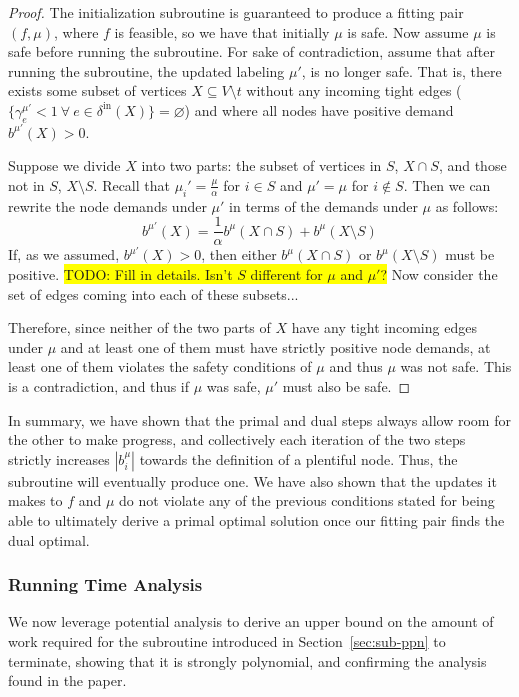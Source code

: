 \documentclass[11pt]{article}
\theoremstyle{definition}
\theoremstyle{definition}
\newcommand{\biu}{b_{i}^{\mu}}
\newcommand{\vnott}{V \setminus t}
\newcommand{\din}{\delta^{\text{in}}}
\newcommand{\fp}{(f,\mu)}
\newcommand{\todo}[1]{\colorbox{yellow}{TODO: #1}}
\begin{document}
\begin{proof}
The initialization subroutine is guaranteed to produce a fitting pair $\fp$,
where $f$ is feasible, so we have that initially $\mu$ is safe. Now assume $\mu$
is safe before running the subroutine. For sake of contradiction, assume that
after running the subroutine, the updated labeling $\mu'$,
is no longer safe. That is, there exists some subset of vertices $X \subseteq \vnott$  
without any incoming tight edges ($\{\gamma_e^{\mu'} < 1\ \forall\ e \in \din(X)\} = \varnothing$)
and where all nodes have positive demand $b^{\mu'}(X) > 0$.

Suppose we divide $X$ into two parts: the subset of vertices in $S$, $X \cap S$, and those
not in $S$, $X \setminus S$. Recall that $\mu_i' = \frac{\mu}{\alpha}$ for $i\in S$
and $\mu' = \mu$ for $i \notin S$. Then we can rewrite the node demands under $\mu'$
in terms of the demands under $\mu$ as follows:
$$b^{\mu'}(X) = \frac{1}{\alpha}b^{\mu}(X \cap S) + b^{\mu}(X \setminus S)$$
If, as we assumed, $b^{\mu'}(X) > 0$, then either $b^{\mu}(X \cap S)$ or 
$b^{\mu}(X \setminus S)$ must be positive.
\todo{Fill in details. Isn't $S$ different for $\mu$ and $\mu'$?}
Now consider the set of edges coming into each of these subsets...

Therefore, since neither of the two parts of $X$
have any tight incoming edges under $\mu$ and at least one of them
must have strictly positive node demands, at least one of them
violates the safety conditions of $\mu$ and thus $\mu$ was not safe.
This is a contradiction, and thus if $\mu$ was safe, $\mu'$ must also be safe.

\end{proof}

In summary, we have shown that the primal and dual steps always allow room for the other to make progress, and collectively each iteration of the two steps strictly increases $|\biu|$ towards
the definition of a plentiful node. Thus, the subroutine will eventually produce one. We have also shown that the updates it makes to $f$ and $\mu$ do not violate any of the previous conditions stated for being able to ultimately derive a primal optimal solution once our fitting pair finds the dual optimal. 

\subsubsection{Running Time Analysis}

We now leverage potential analysis to derive an upper bound on the amount of work required for the subroutine introduced in Section~\ref{sec:sub-ppn} to terminate, showing that it is strongly polynomial, and confirming the analysis found in the paper. 
\end{document}
